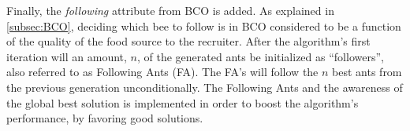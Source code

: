 Finally, the \textit{following} attribute from BCO is added. As explained in \vref{subsec:BCO}, deciding which bee to follow is in BCO considered to be a function of the quality of the food source to the recruiter. After the algorithm's first iteration will an amount, $n$, of the generated ants be initialized as ``followers'', also referred to as Following Ants (FA). The FA's will follow the $n$ best ants from the previous generation unconditionally. The Following Ants and the awareness of the global best solution is implemented in order to boost the algorithm's performance, by favoring good solutions.






